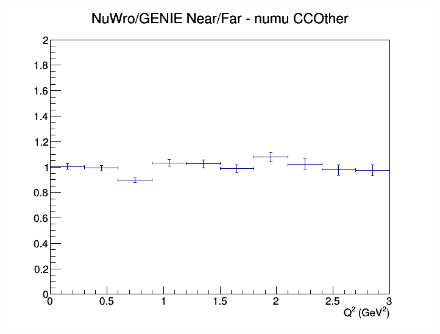 \documentclass[12pt]{article}
\begin{document}
\begin{figure}[h]
\endminipage
{}
\includegraphics[width=\linewidth]{eff_Q2/GAr/ratios/CCOther_NuWro_GENIE_numu_NF_Q2.png}
\endminipage
\newline
\end{figure}
\clearpage
\end{document}
